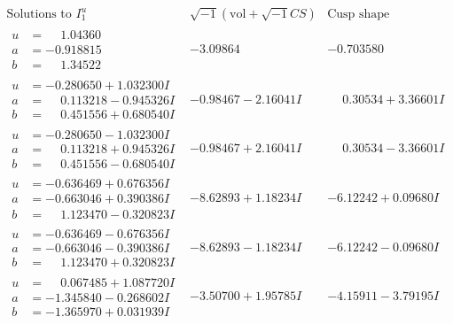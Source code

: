 \documentclass[1p]{elsarticle_modified}
\theoremstyle{definition}
\newcommand{\I}{\sqrt{-1}}
\begin{document}
$$\begin{array}{c|c|c}  
\text{Solutions to }I^u_{1}& \I (\text{vol} + \sqrt{-1}CS) & \text{Cusp shape}\\
 \hline 
\begin{aligned}
u &= \phantom{-}1.04360\phantom{ +0.000000I} \\
a &= -0.918815\phantom{ +0.000000I} \\
b &= \phantom{-}1.34522\phantom{ +0.000000I}\end{aligned}
 & -3.09864\phantom{ +0.000000I} & -0.703580\phantom{ +0.000000I} \\ \hline\begin{aligned}
u &= -0.280650 + 1.032300 I \\
a &= \phantom{-}0.113218 - 0.945326 I \\
b &= \phantom{-}0.451556 + 0.680540 I\end{aligned}
 & -0.98467 - 2.16041 I & \phantom{-}0.30534 + 3.36601 I \\ \hline\begin{aligned}
u &= -0.280650 - 1.032300 I \\
a &= \phantom{-}0.113218 + 0.945326 I \\
b &= \phantom{-}0.451556 - 0.680540 I\end{aligned}
 & -0.98467 + 2.16041 I & \phantom{-}0.30534 - 3.36601 I \\ \hline\begin{aligned}
u &= -0.636469 + 0.676356 I \\
a &= -0.663046 + 0.390386 I \\
b &= \phantom{-}1.123470 - 0.320823 I\end{aligned}
 & -8.62893 + 1.18234 I & -6.12242 + 0.09680 I \\ \hline\begin{aligned}
u &= -0.636469 - 0.676356 I \\
a &= -0.663046 - 0.390386 I \\
b &= \phantom{-}1.123470 + 0.320823 I\end{aligned}
 & -8.62893 - 1.18234 I & -6.12242 - 0.09680 I \\ \hline\begin{aligned}
u &= \phantom{-}0.067485 + 1.087720 I \\
a &= -1.345840 - 0.268602 I \\
b &= -1.365970 + 0.031939 I\end{aligned}
 & -3.50700 + 1.95785 I & -4.15911 - 3.79195 I \\ \hline\begin{aligned}

\end{aligned}
\end{array}$$
\end{document}
